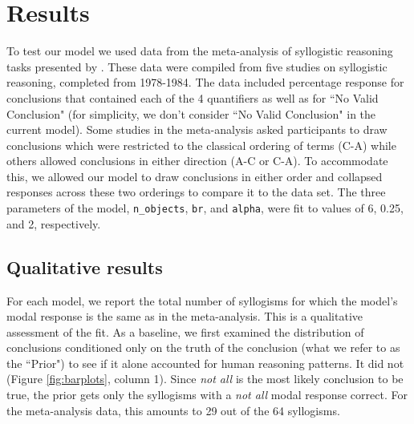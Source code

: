 \documentclass[10pt,letterpaper]{article}
\begin{document}
\section{Results}

To test our model we used data from the meta-analysis of syllogistic reasoning tasks presented by . These data were compiled from five studies on syllogistic reasoning, completed from 1978-1984. The data included percentage response for conclusions that contained each of the 4 quantifiers as well as for ``No Valid Conclusion" (for simplicity, we don't consider ``No Valid Conclusion" in the current model). Some studies in the meta-analysis asked participants to draw conclusions which were restricted to the classical ordering of terms (C-A) while others allowed conclusions in either direction (A-C or C-A). To accommodate this, we allowed our model to draw conclusions in either order and collapsed responses across these two orderings to compare it to the data set.
%
The three parameters of the model, \lstinline{n_objects}, \lstinline{br}, and \lstinline{alpha}, were fit to values of 6, 0.25, and 2, respectively.

\subsection{Qualitative results}
For each model, we report the total number of syllogisms for which the model's modal response is the same as in the meta-analysis. This is a qualitative assessment of the fit. 
As a baseline, we first examined the distribution of conclusions conditioned only on the truth of the conclusion (what we refer to as the ``Prior") to see if it alone accounted for human reasoning patterns. It did not (Figure \ref{fig:barplots}, column 1). Since \emph{not all} is the most likely conclusion to be true, the prior gets only the syllogisms with a \emph{not all} modal response correct. For the meta-analysis data, this amounts to 29 out of the 64 syllogisms.
\end{document}
